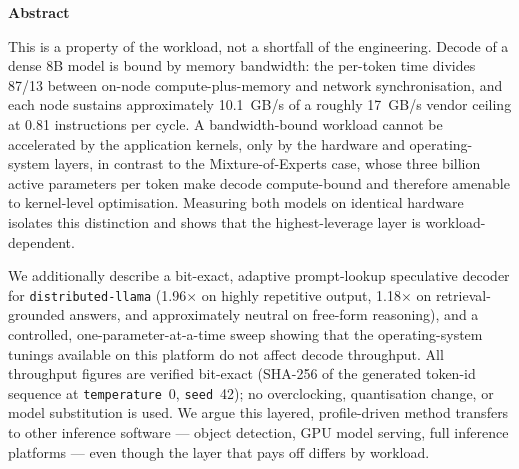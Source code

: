 \documentclass[10pt,a4paper]{article}
\renewenvironment{abstract}{%
  \vspace{2pt}\begin{center}\textbf{Abstract}\end{center}\par\vspace{1pt}%
  \begingroup\small\setlength{\leftskip}{1.8em}\setlength{\rightskip}{1.8em}\noindent\ignorespaces
}{\par\endgroup\vspace{10pt}}
\begin{document}
\begin{abstract}
This is a property of the workload, not a shortfall of the engineering. Decode of a dense 8B model is bound by memory bandwidth: the per-token time divides 87/13 between on-node compute-plus-memory and network synchronisation, and each node sustains approximately 10.1~GB/s of a roughly 17~GB/s vendor ceiling at 0.81 instructions per cycle. A bandwidth-bound workload cannot be accelerated by the application kernels, only by the hardware and operating-system layers, in contrast to the Mixture-of-Experts case, whose three billion active parameters per token make decode compute-bound and therefore amenable to kernel-level optimisation. Measuring both models on identical hardware isolates this distinction and shows that the highest-leverage layer is workload-dependent.

We additionally describe a bit-exact, adaptive prompt-lookup speculative decoder for \texttt{distributed-llama} (1.96$\times$ on highly repetitive output, 1.18$\times$ on retrieval-grounded answers, and approximately neutral on free-form reasoning), and a controlled, one-parameter-at-a-time sweep showing that the operating-system tunings available on this platform do not affect decode throughput. All throughput figures are verified bit-exact (SHA-256 of the generated token-id sequence at \texttt{temperature}~0, \texttt{seed}~42); no overclocking, quantisation change, or model substitution is used. We argue this layered, profile-driven method transfers to other inference software --- object detection, GPU model serving, full inference platforms --- even though the layer that pays off differs by workload.
\end{abstract}
\end{document}
